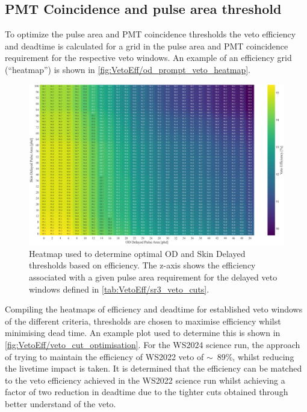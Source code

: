 \subsection{PMT Coincidence and pulse area threshold}
To optimize the pulse area and PMT coincidence thresholds the veto efficiency and deadtime is calculated for a grid in the pulse area and PMT coincidence requirement for the respective veto windows. An example of an efficiency grid (``heatmap'') is shown in \autoref{fig:VetoEff/od_prompt_veto_heatmap}. %

\begin{figure}
	\centering
	\includegraphics[width=\textwidth]{figures/VetoEfficiency/Heatmap600us_ODDelayedSkinDelayedThresholds.png}
	\caption[Heatmap used to determine optimal OD and Skin Delayed thresholds based on efficiency.]{Heatmap used to determine optimal OD and Skin Delayed thresholds based on efficiency. The z-axis shows the efficiency associated with a given pulse area requirement for the delayed veto windows defined in \autoref{tab:VetoEff/sr3_veto_cuts}.}
	\label{fig:VetoEff/od_prompt_veto_heatmap}
\end{figure}

Compiling the heatmaps of efficiency and deadtime for established veto windows of the different criteria, thresholds are chosen to maximise efficiency whilst minimising dead time. An example plot used to determine this is shown in \autoref{fig:VetoEff/veto_cut_optimisation}.
For the WS2024 science run, the approach of trying to maintain the efficiency of WS2022 veto of $\sim$~89\%, whilst reducing the livetime impact is taken. It is determined that the efficiency can be matched to the veto efficiency achieved in the WS2022 science run whilst achieving a factor of two reduction in deadtime due to the tighter cuts obtained through better understand of the veto.

